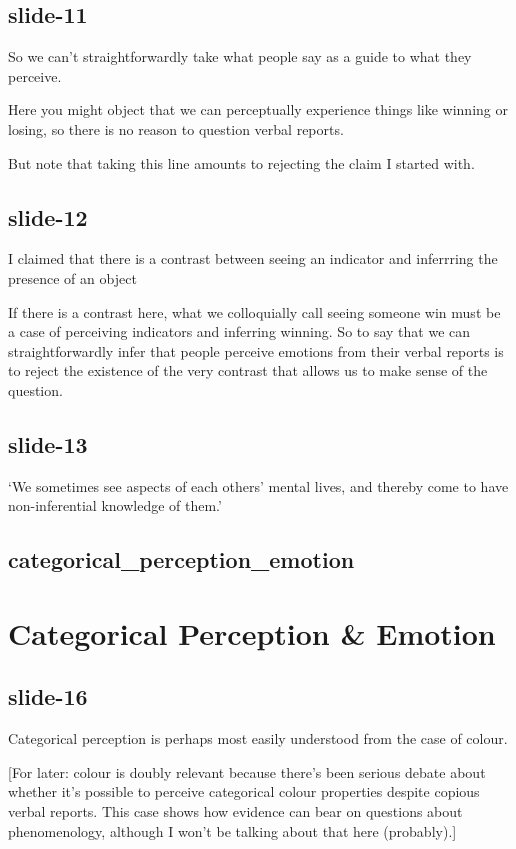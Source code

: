 \documentclass[12pt,\papersize]{extarticle}
\begin{document}
\subsection{slide-11}
So we can’t straightforwardly take what people say as a guide to what they perceive.

Here you might object that we can perceptually experience things like winning or losing,
so there is no reason to question verbal reports.

But note that taking this line amounts to rejecting the claim I started with.

\subsection{slide-12}
I claimed that there is a contrast between seeing an indicator and inferrring the
presence of an object

If there is a contrast here, what we colloquially call seeing someone win must be
a case of perceiving indicators and inferring winning.
So to say that we can straightforwardly infer that people perceive emotions from
their verbal reports is to reject the existence of the very contrast that allows
us to make sense of the question.

\subsection{slide-13}
‘We sometimes see aspects of each others’ mental lives, and thereby come to have non-inferential knowledge of them.’

\subsection{categorical\_perception\_emotion}


\section{Categorical Perception \& Emotion}

\subsection{slide-16}
Categorical perception is perhaps most easily understood from the case of colour.

[For later: colour is doubly relevant because there's been serious debate about
whether it's possible to perceive categorical
colour properties despite copious verbal reports.
This case shows how evidence can bear on questions about phenomenology,
although I won’t be talking about that here (probably).]
\end{document}
